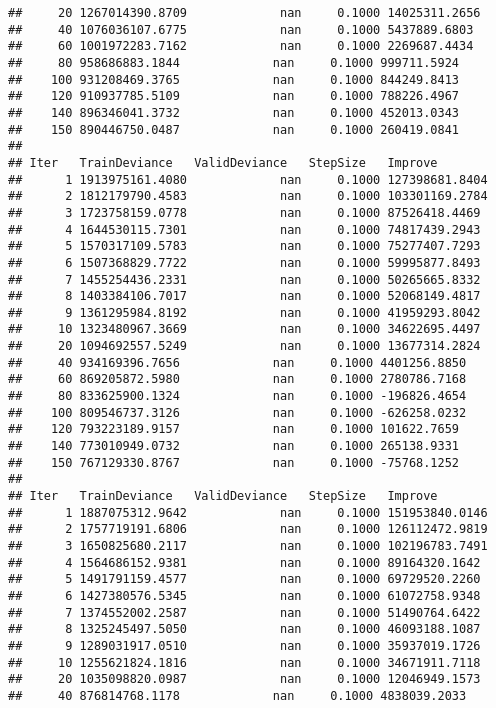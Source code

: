 \documentclass[
]{article}
\begin{document}
\begin{verbatim}
##     20 1267014390.8709             nan     0.1000 14025311.2656
##     40 1076036107.6775             nan     0.1000 5437889.6803
##     60 1001972283.7162             nan     0.1000 2269687.4434
##     80 958686883.1844             nan     0.1000 999711.5924
##    100 931208469.3765             nan     0.1000 844249.8413
##    120 910937785.5109             nan     0.1000 788226.4967
##    140 896346041.3732             nan     0.1000 452013.0343
##    150 890446750.0487             nan     0.1000 260419.0841
## 
## Iter   TrainDeviance   ValidDeviance   StepSize   Improve
##      1 1913975161.4080             nan     0.1000 127398681.8404
##      2 1812179790.4583             nan     0.1000 103301169.2784
##      3 1723758159.0778             nan     0.1000 87526418.4469
##      4 1644530115.7301             nan     0.1000 74817439.2943
##      5 1570317109.5783             nan     0.1000 75277407.7293
##      6 1507368829.7722             nan     0.1000 59995877.8493
##      7 1455254436.2331             nan     0.1000 50265665.8332
##      8 1403384106.7017             nan     0.1000 52068149.4817
##      9 1361295984.8192             nan     0.1000 41959293.8042
##     10 1323480967.3669             nan     0.1000 34622695.4497
##     20 1094692557.5249             nan     0.1000 13677314.2824
##     40 934169396.7656             nan     0.1000 4401256.8850
##     60 869205872.5980             nan     0.1000 2780786.7168
##     80 833625900.1324             nan     0.1000 -196826.4654
##    100 809546737.3126             nan     0.1000 -626258.0232
##    120 793223189.9157             nan     0.1000 101622.7659
##    140 773010949.0732             nan     0.1000 265138.9331
##    150 767129330.8767             nan     0.1000 -75768.1252
## 
## Iter   TrainDeviance   ValidDeviance   StepSize   Improve
##      1 1887075312.9642             nan     0.1000 151953840.0146
##      2 1757719191.6806             nan     0.1000 126112472.9819
##      3 1650825680.2117             nan     0.1000 102196783.7491
##      4 1564686152.9381             nan     0.1000 89164320.1642
##      5 1491791159.4577             nan     0.1000 69729520.2260
##      6 1427380576.5345             nan     0.1000 61072758.9348
##      7 1374552002.2587             nan     0.1000 51490764.6422
##      8 1325245497.5050             nan     0.1000 46093188.1087
##      9 1289031917.0510             nan     0.1000 35937019.1726
##     10 1255621824.1816             nan     0.1000 34671911.7118
##     20 1035098820.0987             nan     0.1000 12046949.1573
##     40 876814768.1178             nan     0.1000 4838039.2033

\end{verbatim}
\end{document}

